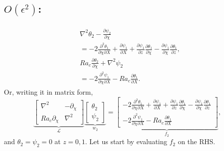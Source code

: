 \documentclass{article}
\newcommand{\pd}[2]{\frac{\partial{#1}}{\partial{#2}}}
\newcommand{\pddmixed}[3]{\frac{\partial^2{#1}}{\partial{#2}\partial{#3}}}
\newcommand{\lap}[1]{\nabla^{2}{#1}}
\begin{document}
\subsection{$O(\epsilon^{2})$:}
\begin{align}
 \begin{split}
  & \lap{\theta_{2}} - \pd{\psi_{2}}{\chi} \\
  & = -2 \pddmixed{\theta_{1}}{\chi}{X} + \pd{\psi_{1}}{X} + \pd{\psi_{1}}{z}\pd{\theta_{1}}{\chi} - \pd{\psi_{1}}{\chi}\pd{\theta_{1}}{z}, \\
  & Ra_{c} \pd{\theta_{2}}{\chi} + \lap{\psi_{2}} \\
  &=-2\pddmixed{\psi_{1}}{\chi}{X} - Ra_{c}\pd{\theta_{1}}{X}.
 \end{split}
\end{align}
Or, writing it in matrix form,
\begin{equation}
 \underbrace{\begin{bmatrix}
  \lap{} & -\partial_{\chi} \\
  Ra_{c}\partial_{\chi} & \lap{}
 \end{bmatrix}}_{\mathcal{L}}
 \underbrace{\begin{bmatrix}
  \theta_{2} \\
 \psi_{2}
 \end{bmatrix}}_{w_{2}}
 = \underbrace{\begin{bmatrix}
   -2 \pddmixed{\theta_{1}}{\chi}{X} + \pd{\psi_{1}}{X} + \pd{\psi_{1}}{z}\pd{\theta_{1}}{\chi} - \pd{\psi_{1}}{\chi}\pd{\theta_{1}}{z} \\
  -2\pddmixed{\psi_{1}}{\chi}{X} - Ra_{c}\pd{\theta_{1}}{X}
 \end{bmatrix}}_{f_{2}},
\end{equation}
and $\theta_{2} = \psi_{2} = 0$ at $z=0, 1$. 
%
Let us start by evaluating $f_{2}$ on the RHS. 
\end{document}
